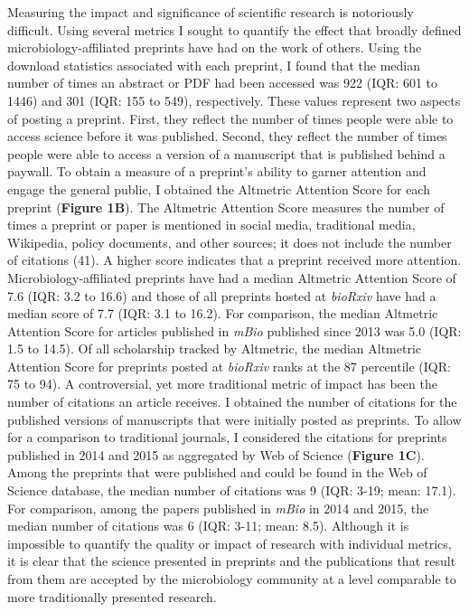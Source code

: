 \documentclass[11pt,]{article}
\begin{document}
Measuring the impact and significance of scientific research is
notoriously difficult. Using several metrics I sought to quantify the
effect that broadly defined microbiology-affiliated preprints have had
on the work of others. Using the download statistics associated with
each preprint, I found that the median number of times an abstract or
PDF had been accessed was 922 (IQR: 601 to 1446) and 301 (IQR: 155 to
549), respectively. These values represent two aspects of posting a
preprint. First, they reflect the number of times people were able to
access science before it was published. Second, they reflect the number
of times people were able to access a version of a manuscript that is
published behind a paywall. To obtain a measure of a preprint's ability
to garner attention and engage the general public, I obtained the
Altmetric Attention Score for each preprint (\textbf{Figure 1B}). The
Altmetric Attention Score measures the number of times a preprint or
paper is mentioned in social media, traditional media, Wikipedia, policy
documents, and other sources; it does not include the number of
citations (41). A higher score indicates that a preprint received more
attention. Microbiology-affiliated preprints have had a median Altmetric
Attention Score of 7.6 (IQR: 3.2 to 16.6) and those of all preprints
hosted at \emph{bioRxiv} have had a median score of 7.7 (IQR: 3.1 to
16.2). For comparison, the median Altmetric Attention Score for articles
published in \emph{mBio} published since 2013 was 5.0 (IQR: 1.5 to
14.5). Of all scholarship tracked by Altmetric, the median Altmetric
Attention Score for preprints posted at \emph{bioRxiv} ranks at the 87
percentile (IQR: 75 to 94). A controversial, yet more traditional metric
of impact has been the number of citations an article receives. I
obtained the number of citations for the published versions of
manuscripts that were initially posted as preprints. To allow for a
comparison to traditional journals, I considered the citations for
preprints published in 2014 and 2015 as aggregated by Web of Science
(\textbf{Figure 1C}). Among the preprints that were published and could
be found in the Web of Science database, the median number of citations
was 9 (IQR: 3-19; mean: 17.1). For comparison, among the papers
published in \emph{mBio} in 2014 and 2015, the median number of
citations was 6 (IQR: 3-11; mean: 8.5). Although it is impossible to
quantify the quality or impact of research with individual metrics, it
is clear that the science presented in preprints and the publications
that result from them are accepted by the microbiology community at a
level comparable to more traditionally presented research.
\end{document}
